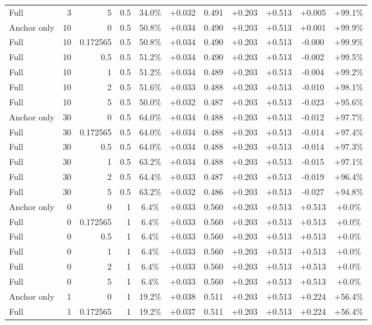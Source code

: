 \begin{table}[htbp]
\begin{tabular}{lrrrccccccc}
Full & 3 & 5 & 0.5 & 34.0\% & +0.032 & 0.491 & +0.203 & +0.513 & +0.005 & +99.1\% \\
Anchor only & 10 & 0 & 0.5 & 50.8\% & +0.034 & 0.490 & +0.203 & +0.513 & +0.001 & +99.9\% \\
Full & 10 & 0.172565 & 0.5 & 50.8\% & +0.034 & 0.490 & +0.203 & +0.513 & -0.000 & +99.9\% \\
Full & 10 & 0.5 & 0.5 & 51.2\% & +0.034 & 0.490 & +0.203 & +0.513 & -0.002 & +99.5\% \\
Full & 10 & 1 & 0.5 & 51.2\% & +0.034 & 0.489 & +0.203 & +0.513 & -0.004 & +99.2\% \\
Full & 10 & 2 & 0.5 & 51.6\% & +0.033 & 0.488 & +0.203 & +0.513 & -0.010 & +98.1\% \\
Full & 10 & 5 & 0.5 & 50.0\% & +0.032 & 0.487 & +0.203 & +0.513 & -0.023 & +95.6\% \\
Anchor only & 30 & 0 & 0.5 & 64.0\% & +0.034 & 0.488 & +0.203 & +0.513 & -0.012 & +97.7\% \\
Full & 30 & 0.172565 & 0.5 & 64.0\% & +0.034 & 0.488 & +0.203 & +0.513 & -0.014 & +97.4\% \\
Full & 30 & 0.5 & 0.5 & 64.0\% & +0.034 & 0.488 & +0.203 & +0.513 & -0.014 & +97.3\% \\
Full & 30 & 1 & 0.5 & 63.2\% & +0.034 & 0.488 & +0.203 & +0.513 & -0.015 & +97.1\% \\
Full & 30 & 2 & 0.5 & 64.4\% & +0.033 & 0.487 & +0.203 & +0.513 & -0.019 & +96.4\% \\
Full & 30 & 5 & 0.5 & 63.2\% & +0.032 & 0.486 & +0.203 & +0.513 & -0.027 & +94.8\% \\
Anchor only & 0 & 0 & 1 & 6.4\% & +0.033 & 0.560 & +0.203 & +0.513 & +0.513 & +0.0\% \\
Full & 0 & 0.172565 & 1 & 6.4\% & +0.033 & 0.560 & +0.203 & +0.513 & +0.513 & +0.0\% \\
Full & 0 & 0.5 & 1 & 6.4\% & +0.033 & 0.560 & +0.203 & +0.513 & +0.513 & +0.0\% \\
Full & 0 & 1 & 1 & 6.4\% & +0.033 & 0.560 & +0.203 & +0.513 & +0.513 & +0.0\% \\
Full & 0 & 2 & 1 & 6.4\% & +0.033 & 0.560 & +0.203 & +0.513 & +0.513 & +0.0\% \\
Full & 0 & 5 & 1 & 6.4\% & +0.033 & 0.560 & +0.203 & +0.513 & +0.513 & +0.0\% \\
Anchor only & 1 & 0 & 1 & 19.2\% & +0.038 & 0.511 & +0.203 & +0.513 & +0.224 & +56.4\% \\
Full & 1 & 0.172565 & 1 & 19.2\% & +0.037 & 0.511 & +0.203 & +0.513 & +0.224 & +56.4\% \\

\end{tabular}
\end{table}
